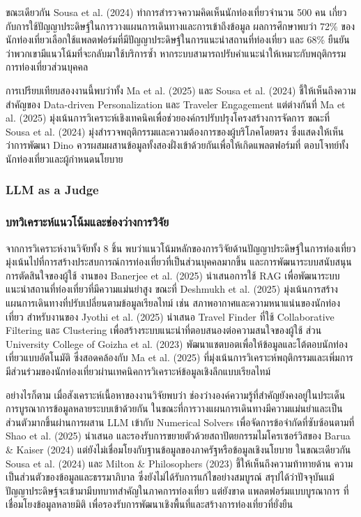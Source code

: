 ขณะเดียวกัน Sousa et al. (2024) ทำการสำรวจความคิดเห็นนักท่องเที่ยวจำนวน 500 คน เกี่ยวกับการใช้ปัญญาประดิษฐ์ในการวางแผนการเดินทางและการเข้าถึงข้อมูล ผลการศึกษาพบว่า 72\% ของนักท่องเที่ยวเลือกใช้แพลตฟอร์มที่มีปัญญาประดิษฐ์ในการแนะนำสถานที่ท่องเที่ยว และ 68\% ยืนยันว่าพวกเขามีแนวโน้มที่จะกลับมาใช้บริการซ้ำ หากระบบสามารถปรับคำแนะนำให้เหมาะกับพฤติกรรมการท่องเที่ยวส่วนบุคคล

การเปรียบเทียบสองงานนี้พบว่าทั้ง Ma et al. (2025) และ Sousa et al. (2024) ชี้ให้เห็นถึงความสำคัญของ Data-driven Personalization และ Traveler Engagement แต่ต่างกันที่ Ma et al. (2025) มุ่งเน้นการวิเคราะห์เชิงเทคนิคเพื่อช่วยองค์กรปรับปรุงโครงสร้างการจัดการ ขณะที่ Sousa et al. (2024) มุ่งสำรวจพฤติกรรมและความต้องการของผู้บริโภคโดยตรง ซึ่งแสดงให้เห็นว่าการพัฒนา Dino ควรผสมผสานข้อมูลทั้งสองฝั่งเข้าด้วยกันเพื่อให้เกิดแพลตฟอร์มที่ ตอบโจทย์ทั้งนักท่องเที่ยวและผู้กำหนดนโยบาย

\subsubsection{LLM as a Judge}

\subsubsection{บทวิเคราะห์แนวโน้มและช่องว่างการวิจัย}

จากการวิเคราะห์งานวิจัยทั้ง 8 ชิ้น พบว่าแนวโน้มหลักของการวิจัยด้านปัญญาประดิษฐ์ในการท่องเที่ยว มุ่งเน้นไปที่การสร้างประสบการณ์การท่องเที่ยวที่เป็นส่วนบุคคลมากขึ้น และการพัฒนาระบบสนับสนุนการตัดสินใจของผู้ใช้ งานของ Banerjee et al. (2025) นำเสนอการใช้ RAG เพื่อพัฒนาระบบแนะนำสถานที่ท่องเที่ยวที่มีความแม่นยำสูง ขณะที่ Deshmukh et al. (2025) มุ่งเน้นการสร้างแผนการเดินทางที่ปรับเปลี่ยนตามข้อมูลเรียลไทม์ เช่น สภาพอากาศและความหนาแน่นของนักท่องเที่ยว สำหรับงานของ Jyothi et al. (2025) นำเสนอ Travel Finder ที่ใช้ Collaborative Filtering และ Clustering เพื่อสร้างระบบแนะนำที่ตอบสนองต่อความสนใจของผู้ใช้ ส่วน University College of Goizha et al. (2023) พัฒนาแชตบอตเพื่อให้ข้อมูลและโต้ตอบนักท่องเที่ยวแบบอัตโนมัติ ซึ่งสอดคล้องกับ Ma et al. (2025) ที่มุ่งเน้นการวิเคราะห์พฤติกรรมและเพิ่มการมีส่วนร่วมของนักท่องเที่ยวผ่านเทคนิคการวิเคราะห์ข้อมูลเชิงลึกแบบเรียลไทม์

อย่างไรก็ตาม เมื่อสังเคราะห์เนื้อหาของงานวิจัยพบว่า ช่องว่างองค์ความรู้ที่สำคัญยังคงอยู่ในประเด็น การบูรณาการข้อมูลหลายระบบเข้าด้วยกัน ในขณะที่การวางแผนการเดินทางมีความแม่นยำและเป็นส่วนตัวมากขึ้นผ่านการผสาน LLM เข้ากับ Numerical Solvers เพื่อจัดการข้อจำกัดที่ซับซ้อนตามที่ Shao et al. (2025) นำเสนอ และรองรับการขยายตัวด้วยสถาปัตยกรรมไมโครเซอร์วิสของ Barua \& Kaiser (2024) แต่ยังไม่เชื่อมโยงกับฐานข้อมูลของภาครัฐหรือข้อมูลเชิงนโยบาย ในขณะเดียวกัน Sousa et al. (2024) และ Milton \& Philosophers (2023) ชี้ให้เห็นถึงความท้าทายด้าน ความเป็นส่วนตัวของข้อมูลและธรรมาภิบาล ซึ่งยังไม่ได้รับการแก้ไขอย่างสมบูรณ์ สรุปได้ว่าปัจจุบันแม้ปัญญาประดิษฐ์จะเข้ามามีบทบาทสำคัญในภาคการท่องเที่ยว แต่ยังขาด แพลตฟอร์มแบบบูรณาการ ที่เชื่อมโยงข้อมูลหลายมิติ เพื่อรองรับการพัฒนาเชิงพื้นที่และสร้างการท่องเที่ยวที่ยั่งยืน
